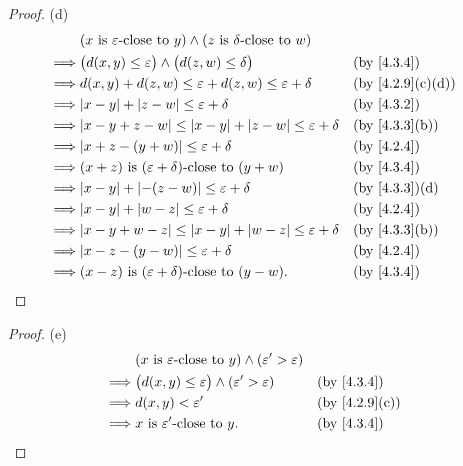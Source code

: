 \begin{proof}{(d)}
  \begin{align*}
             & (x \text{ is \(\varepsilon\)-close to } y) \land (z \text{ is \(\delta\)-close to } w)                                     \\
    \implies & \big(d(x, y) \leq \varepsilon\big) \land \big(d(z, w) \leq \delta\big)                 &  & \text{(by \cref{4.3.4})}       \\
    \implies & d(x, y) + d(z, w) \leq \varepsilon + d(z, w) \leq \varepsilon + \delta                 &  & \text{(by \cref{4.2.9}(c)(d))} \\
    \implies & \abs{x - y} + \abs{z - w} \leq \varepsilon + \delta                                    &  & \text{(by \cref{4.3.2})}       \\
    \implies & \abs{x - y + z - w} \leq \abs{x - y} + \abs{z - w} \leq \varepsilon + \delta           &  & \text{(by \cref{4.3.3}(b))}    \\
    \implies & \abs{x + z - (y + w)} \leq \varepsilon + \delta                                        &  & \text{(by \cref{4.2.4})}       \\
    \implies & (x + z) \text{ is \((\varepsilon + \delta)\)-close to } (y + w)                        &  & \text{(by \cref{4.3.4})}       \\
    \implies & \abs{x - y} + \abs{-(z - w)} \leq \varepsilon + \delta                                 &  & \text{(by \cref{4.3.3})(d)}    \\
    \implies & \abs{x - y} + \abs{w - z} \leq \varepsilon + \delta                                    &  & \text{(by \cref{4.2.4})}       \\
    \implies & \abs{x - y + w - z} \leq \abs{x - y} + \abs{w - z} \leq \varepsilon + \delta           &  & \text{(by \cref{4.3.3}(b))}    \\
    \implies & \abs{x - z - (y - w)} \leq \varepsilon + \delta                                        &  & \text{(by \cref{4.2.4})}       \\
    \implies & (x - z) \text{ is \((\varepsilon + \delta)\)-close to } (y - w).                       &  & \text{(by \cref{4.3.4})}
  \end{align*}
\end{proof}

\begin{proof}{(e)}
  \begin{align*}
             & (x \text{ is \(\varepsilon\)-close to } y) \land (\varepsilon' > \varepsilon)                                  \\
    \implies & \big(d(x, y) \leq \varepsilon\big) \land (\varepsilon' > \varepsilon)         &  & \text{(by \cref{4.3.4})}    \\
    \implies & d(x, y) < \varepsilon'                                                        &  & \text{(by \cref{4.2.9}(c))} \\
    \implies & x \text{ is \(\varepsilon'\)-close to } y.                                    &  & \text{(by \cref{4.3.4})}
  \end{align*}
\end{proof}

